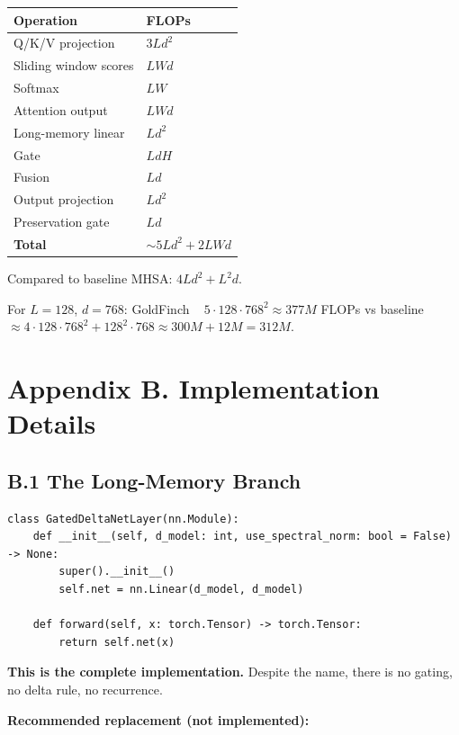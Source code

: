 \begin{table}[H]
\centering
\small
\begin{tabular}{ll}
\toprule
\textbf{Operation} & \textbf{FLOPs} \\
\midrule
Q/K/V projection & $3 L d^2$ \\
Sliding window scores & $L W d$ \\
Softmax & $L W$ \\
Attention output & $L W d$ \\
Long-memory linear & $L d^2$ \\
Gate & $L d H$ \\
Fusion & $L d$ \\
Output projection & $L d^2$ \\
Preservation gate & $L d$ \\
\textbf{Total} & $\sim 5 L d^2 + 2 L W d$ \\
\bottomrule
\end{tabular}
\end{table}

Compared to baseline MHSA: $4 L d^2 + L^2 d$.

For $L = 128$, $d = 768$: GoldFinch ~ $5 \cdot 128 \cdot 768^2 \approx 
377M$ FLOPs vs baseline $\approx 4 \cdot 128 \cdot 768^2 + 128^2 \cdot 768 
\approx 300M + 12M = 312M$.




\section{Appendix B. Implementation Details}

\subsection{B.1 The Long-Memory Branch}

\begin{lstlisting}
class GatedDeltaNetLayer(nn.Module):
    def __init__(self, d_model: int, use_spectral_norm: bool = False) -> None:
        super().__init__()
        self.net = nn.Linear(d_model, d_model)

    def forward(self, x: torch.Tensor) -> torch.Tensor:
        return self.net(x)
\end{lstlisting}

\textbf{This is the complete implementation.} Despite the name, there is no 
gating, no delta rule, no recurrence.

\textbf{Recommended replacement (not implemented):}

